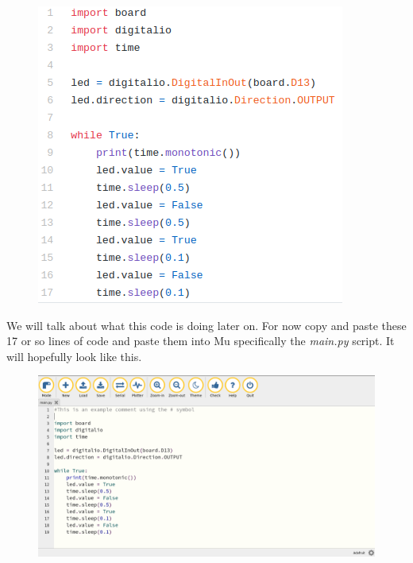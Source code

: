 \begin{figure}[H]
  \begin{center}
    \includegraphics[width=\textwidth]{Figures/blink.png}
  \end{center}
\end{figure}
We will talk about what this code is doing later on. For now copy and
paste these 17 or so lines of code and paste them into Mu specifically
the {\it main.py} script. It will hopefully look like this.
\begin{figure}[H]
  \begin{center}
    \includegraphics[width=\textwidth]{Figures/blinkmu.png}
  \end{center}
\end{figure}
